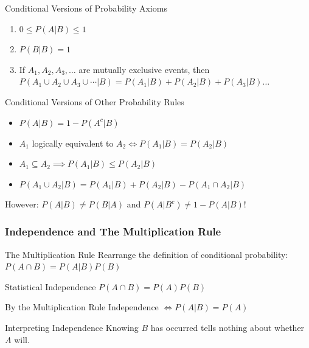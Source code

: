 \documentclass{beamer}
\begin{document}
\begin{frame}
  \small
  \begin{block}{Conditional Versions of Probability Axioms}
    \begin{enumerate}
      \item $0 \leq P(A|B) \leq 1$
      \item $P(B|B) = 1$
      \item If $A_1, A_2, A_3, \dots$ are mutually exclusive events, then $P(A_1\cup A_2\cup A_3 \cup \cdots|B) = P(A_1|B) + P(A_2|B) + P(A_3|B)\dots$
    \end{enumerate}
  \end{block}

  \begin{block}{Conditional Versions of Other Probability Rules}
    \begin{itemize}
      \item $P(A|B) = 1 - P(A^c|B)$
      \item $A_1$ logically equivalent to $A_2 \iff P(A_1|B) = P(A_2|B)$
      \item $A_1 \subseteq A_2 \implies P(A_1|B) \leq P(A_2|B)$  
      \item $P(A_1 \cup A_2 | B) = P(A_1|B) + P(A_2|B) - P(A_1 \cap A_2|B)$
    \end{itemize}
  \end{block}

    \alert{However: $P(A|B) \neq P(B|A)$ and $P(A|B^c) \neq 1 - P(A|B)$!}
  
\end{frame}
\begin{frame}
\frametitle{Independence and The Multiplication Rule}
\begin{block}{The Multiplication Rule}
Rearrange the definition of conditional probability:
$P(A\cap B) = P(A|B)P(B)$
\end{block}\pause
\begin{block}{Statistical Independence}
$P(A\cap B) = P(A)P(B)$
\end{block}\pause
\begin{alertblock}{By the Multiplication Rule}
$\mbox{Independence } \iff P(A|B) = P(A)$\\
\end{alertblock}\pause
\begin{block}{Interpreting Independence}
Knowing $B$ has occurred tells nothing about whether $A$ will.
\end{block}
\end{frame}
\end{document}
